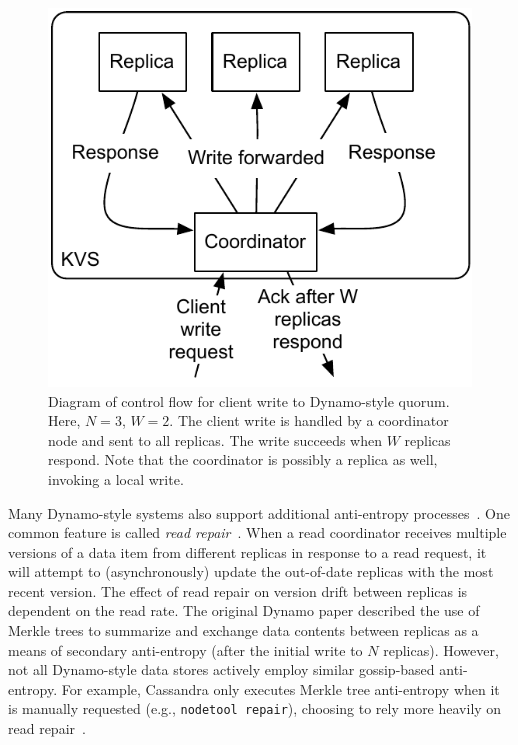 \documentclass{vldb}
\begin{document}
\begin{figure}
\centering
\includegraphics[width=.8\columnwidth]{figs/dynamo-quorum.pdf}
\vspace{-8pt}
\caption{Diagram of control flow for client write to Dynamo-style
  quorum.  Here, $N=3$, $W=2$. The client write is handled by a
  coordinator node and sent to all replicas. The write succeeds when
  $W$ replicas respond.  Note that the coordinator is possibly a
  replica as well, invoking a local write.}
\vspace{-12pt}
\label{fig:dynamo-quorum}
\end{figure}

Many Dynamo-style systems also support additional anti-entropy
processes~\cite{nosql}.  One common feature is called \textit{read
  repair}~\cite{dynamo}.  When a read coordinator receives multiple
versions of a data item from different replicas in response to a read
request, it will attempt to (asynchronously) update the out-of-date
replicas with the most recent version.  The effect of read repair on
version drift between replicas is dependent on the read rate.  The
original Dynamo paper described the use of Merkle trees to summarize
and exchange data contents between replicas as a means of secondary
anti-entropy (after the initial write to $N$ replicas).  However, not
all Dynamo-style data stores actively employ similar gossip-based
anti-entropy.  For example, Cassandra only executes Merkle tree
anti-entropy when it is manually requested (e.g., \texttt{nodetool
  repair}), choosing to rely more heavily on read
repair~\cite{cassandra-merkle}.
\end{document}

